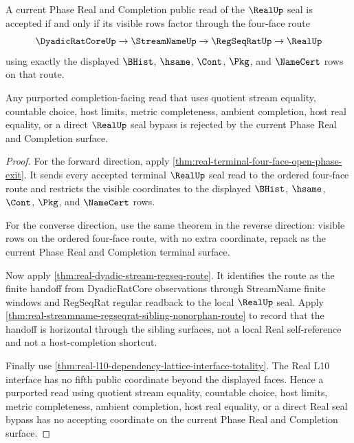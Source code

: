 \begin{theorem}
\label{thm:real-current-phase-four-face-exit-certificate}
A current Phase Real and Completion public read of the $\RealUp$ seal is accepted if
and only if its visible rows factor through the four-face route
$$
\DyadicRatCoreUp \to \StreamNameUp \to \RegSeqRatUp \to \RealUp
$$
using exactly the displayed $\BHist$, $\hsame$, $\Cont$, $\Pkg$, and
$\NameCert$ rows on that route.

Any purported completion-facing read that uses quotient stream equality,
countable choice, host limits, metric completeness, ambient completion, host
real equality, or a direct $\RealUp$ seal bypass is rejected by the current
Phase Real and Completion surface.
\end{theorem}
\begin{proof}
For the forward direction, apply
\autoref{thm:real-terminal-four-face-open-phase-exit}. It sends every accepted
terminal $\RealUp$ seal read to the ordered four-face route and restricts the
visible coordinates to the displayed $\BHist$, $\hsame$, $\Cont$, $\Pkg$, and
$\NameCert$ rows.

For the converse direction, use the same theorem in the reverse direction:
visible rows on the ordered four-face route, with no extra coordinate, repack
as the current Phase Real and Completion terminal surface.

Now apply \autoref{thm:real-dyadic-stream-regseq-route}. It identifies the
route as the finite handoff from DyadicRatCore observations through
StreamName finite windows and RegSeqRat regular readback to the local
$\RealUp$ seal. Apply
\autoref{thm:real-streamname-regseqrat-sibling-nonorphan-route} to record
that the handoff is horizontal through the sibling surfaces, not a local Real
self-reference and not a host-completion shortcut.

Finally use
\autoref{thm:real-l10-dependency-lattice-interface-totality}. The Real L10
interface has no fifth public coordinate beyond the displayed faces. Hence a
purported read using quotient stream equality, countable choice, host limits,
metric completeness, ambient completion, host real equality, or a direct Real
seal bypass has no accepting coordinate on the current Phase Real and
Completion surface.
\end{proof}

